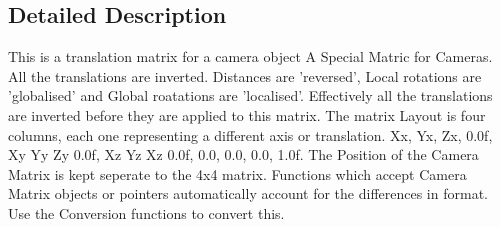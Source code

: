 \subsection{Detailed Description}
This is a translation matrix for a camera object A Special Matric for Cameras. All the translations are inverted. Distances are 'reversed', Local rotations are 'globalised' and Global roatations are 'localised'. Effectively all the translations are inverted before they are applied to this matrix. The matrix Layout is four columns, each one representing a different axis or translation. Xx, Yx, Zx, 0.0f, Xy Yy Zy 0.0f, Xz Yz Xz 0.0f, 0.0, 0.0, 0.0, 1.0f. The Position of the Camera Matrix is kept seperate to the 4x4 matrix. Functions which accept Camera Matrix objects or pointers automatically account for the differences in format. Use the Conversion functions to convert this. 